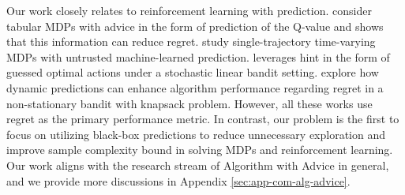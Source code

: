 

Our work closely relates to reinforcement learning with prediction. \cite{golowich2022can} consider tabular MDPs with advice in the form of prediction of the Q-value and shows that this information can reduce regret. \cite{li2024beyond} study single-trajectory time-varying MDPs with untrusted machine-learned prediction. \cite{cutkosky2022leveraging} leverages hint in the form of guessed optimal actions under a stochastic linear bandit setting. \cite{lyu2023bandits} explore how dynamic predictions can enhance algorithm performance regarding regret in a non-stationary bandit with knapsack problem. However, all these works use regret as the primary performance metric. In contrast, our problem is the first to focus on utilizing black-box predictions to reduce unnecessary exploration and improve sample complexity bound in solving MDPs and reinforcement learning. Our work aligns with the research stream of Algorithm with Advice \cite{mitzenmacher2022algorithms} in general, and we provide more discussions in Appendix \ref{sec:app-com-alg-advice}.



